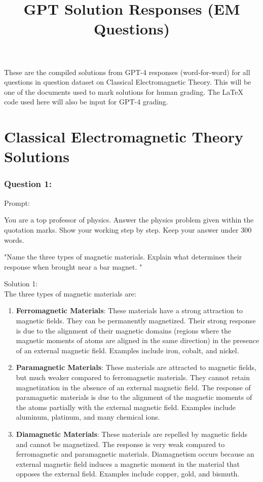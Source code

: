 \documentclass[a4paper,11pt]{article}
\begin{document}
\title{GPT Solution Responses (EM Questions)}
\author{}
\date{}
\maketitle

\noindent These are the compiled solutions from GPT-4 responses (word-for-word) for all questions in question dataset on Classical Electromagnetic Theory. This will be one of the documents used to mark solutions for human grading. The LaTeX code used here will also be input for GPT-4 grading. 

\section{Classical Electromagnetic Theory Solutions}

\subsubsection*{Question 1:}

Prompt:
\begin{spverbatim}
    You are a top professor of physics. Answer the physics problem given within the quotation marks. Show your working step by step. Keep your answer under 300 words.

    "Name the three types of magnetic materials. Explain what determines their response when brought near a bar magnet. "
\end{spverbatim} 

\bigskip

\noindent Solution 1: \\

The three types of magnetic materials are:

\begin{enumerate}
    \item \textbf{Ferromagnetic Materials}: These materials have a strong attraction to magnetic fields. They can be permanently magnetized. Their strong response is due to the alignment of their magnetic domains (regions where the magnetic moments of atoms are aligned in the same direction) in the presence of an external magnetic field. Examples include iron, cobalt, and nickel.
    \item \textbf{Paramagnetic Materials}: These materials are attracted to magnetic fields, but much weaker compared to ferromagnetic materials. They cannot retain magnetization in the absence of an external magnetic field. The response of paramagnetic materials is due to the alignment of the magnetic moments of the atoms partially with the external magnetic field. Examples include aluminum, platinum, and many chemical ions.
    \item \textbf{Diamagnetic Materials}: These materials are repelled by magnetic fields and cannot be magnetized. The response is very weak compared to ferromagnetic and paramagnetic materials. Diamagnetism occurs because an external magnetic field induces a magnetic moment in the material that opposes the external field. Examples include copper, gold, and bismuth.
\end{enumerate}
\end{document}
